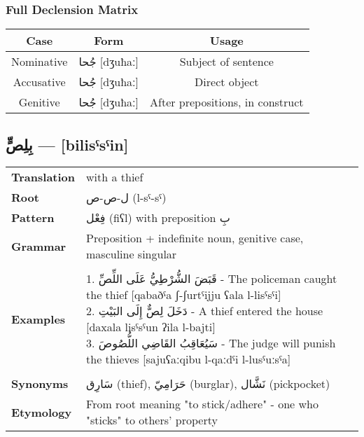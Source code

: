\documentclass[letterpaper,12pt]{article}
\begin{document}
\subsubsection*{Full Declension Matrix}
\begin{tabular}{|c|c|c|}
\hline
\textbf{Case} & \textbf{Form} & \textbf{Usage} \\
\hline
Nominative & \textarabic{جُحا} [dʒuħaː] & Subject of sentence \\
\hline
Accusative & \textarabic{جُحا} [dʒuħaː] & Direct object \\
\hline
Genitive & \textarabic{جُحا} [dʒuħaː] & After prepositions, in construct \\
\hline
\end{tabular}

\subsection{\textarabic{بِلِصٍّ} — [bilisˤsˤin]}
\begin{tabular}{p{3cm}p{10cm}}
\toprule
\textbf{Translation} & with a thief \\
\textbf{Root} & \textarabic{ل-ص-ص} (l-sˤ-sˤ) \\
\textbf{Pattern} & \textarabic{فِعْل} (fiʕl) with preposition \textarabic{بِ} \\
\textbf{Grammar} & Preposition + indefinite noun, genitive case, masculine singular \\
\midrule \\
\textbf{Examples} & \makecell[l]{\parbox{9.5cm}{
1. \textarabic{قَبَضَ الشُّرْطِيُّ عَلَى اللِّصِّ} - The policeman caught the thief [qabaðˤa ʃ-ʃurtˤijju ʕala l-lisˤsˤi]\\
2. \textarabic{دَخَلَ لِصٌّ إِلَى البَيْتِ} - A thief entered the house [daxala lisˤsˤun ʔila l-bajti]\\
3. \textarabic{سَيُعَاقِبُ القَاضِي اللُّصُوصَ} - The judge will punish the thieves [sajuʕaːqibu l-qaːdˤi l-lusˤuːsˤa]
}} \\
\midrule \\
\textbf{Synonyms} & \textarabic{سَارِق} (thief), \textarabic{حَرَامِيّ} (burglar), \textarabic{نَشَّال} (pickpocket) \\
\textbf{Etymology} & From root meaning "to stick/adhere" - one who "sticks" to others' property \\
\bottomrule
\end{tabular}
\end{document}
